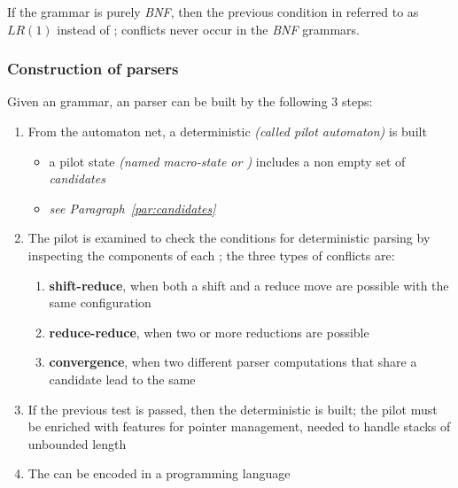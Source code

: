 \documentclass[english]{article}
\begin{document}
\begin{definition}
  \label{def:lro-condition}
  If the grammar is purely \textit{BNF}, then the previous condition in referred to as \(\textit{LR}(1)\) instead of \elro;
  conflicts never occur in the \textit{BNF} grammars.
\end{definition}

\subsubsection[Construction of ELR(1) parser]{Construction of \elro parsers}

Given an \EBNF grammar, an \elro parser can be built by the following \(3\) steps:

\begin{enumerate}
  \item From the automaton net, a deterministic \FSA \textit{(called pilot automaton)} is built
        \begin{itemize}
          \item a pilot state \textit{(named macro-state or \mstate)} includes a non empty set of \textit{candidates}
          \item \textit{see Paragraph~\ref{par:candidates}}
        \end{itemize}
  \item The pilot is examined to check the conditions for deterministic parsing by inspecting the components of each \mstate; the three types of conflicts are:
        \begin{enumerate}[label=\Alph*.]
          \item \textbf{shift-reduce}, when both a shift and a reduce move are possible with the same configuration
          \item \textbf{reduce-reduce}, when two or more reductions are possible
          \item \textbf{convergence}, when two different parser computations that share a candidate lead to the same \mstate
        \end{enumerate}
  \item If the previous test is passed, then the deterministic \PDA is built; the pilot \FSA must be enriched with features for pointer management, needed to handle stacks of unbounded length
  \item The \PDA can be encoded in a programming language
\end{enumerate}
\end{document}

